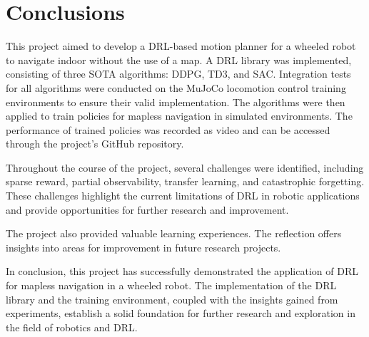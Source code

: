 \newpage
\section{Conclusions} \label{sec:conclusion}

This project aimed to develop a DRL-based motion planner for a wheeled robot to navigate indoor without the use of a map. A DRL library was implemented, consisting of three SOTA algorithms: DDPG, TD3, and SAC. Integration tests for all algorithms were conducted on the MuJoCo locomotion control training environments to ensure their valid implementation. The algorithms were then applied to train policies for mapless navigation in simulated environments. The performance of trained policies was recorded as video and can be accessed through the project's GitHub repository.

Throughout the course of the project, several challenges were identified, including sparse reward, partial observability, transfer learning, and catastrophic forgetting. These challenges highlight the current limitations of DRL in robotic applications and provide opportunities for further research and improvement.

The project also provided valuable learning experiences. The reflection offers insights into areas for improvement in future research projects.

In conclusion, this project has successfully demonstrated the application of DRL for mapless navigation in a wheeled robot. The implementation of the DRL library and the training environment, coupled with the insights gained from experiments, establish a solid foundation for further research and exploration in the field of robotics and DRL.
